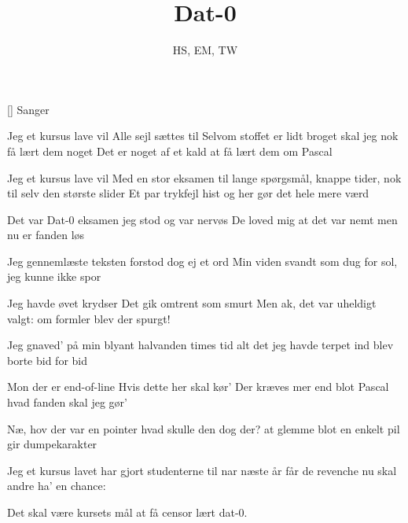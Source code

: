 \documentclass[a4paper,11pt]{article}
\title{Dat-0}
\author{HS, EM, TW}
\begin{document}
\maketitle

\begin{roles}
[] Sanger
\end{roles}


\begin{song}
%
Jeg et kursus lave vil
Alle sejl sættes til
Selvom stoffet er lidt broget
skal jeg nok få lært dem noget
Det er noget af et kald
at få lært dem om Pascal

Jeg et kursus lave vil
Med en stor eksamen til
lange spørgsmål, knappe tider,
nok til selv den største slider
Et par trykfejl hist og her
gør det hele mere værd


%
Det var Dat-0 eksamen
jeg stod og var nervøs
De loved mig at det var nemt
men nu er fanden løs

Jeg gennemlæste teksten
forstod dog ej et ord
Min viden svandt som dug for sol,
jeg kunne ikke spor

Jeg havde øvet krydser
Det gik omtrent som smurt
Men ak, det var uheldigt valgt:
om formler blev der spurgt!

Jeg gnaved' på min blyant
halvanden times tid
alt det jeg havde terpet ind
blev borte bid for bid

Mon der er end-of-line
Hvis dette her skal kør'
Der kræves mer end blot Pascal
hvad fanden skal jeg gør'

Næ, hov der var en pointer
hvad skulle den dog der?
at glemme blot en enkelt pil
gir dumpekarakter


%
Jeg et kursus lavet har
gjort studenterne til nar
næste år får de revenche
nu skal andre ha' en chance:

Det skal være kursets mål
at få censor lært dat-0.
\end{song}
\end{document}
